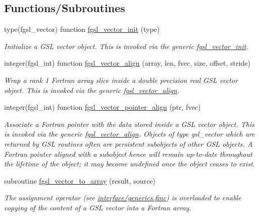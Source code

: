 \subsection*{Functions/\-Subroutines}
\begin{DoxyCompactItemize}
\item 
type(fgsl\-\_\-vector) function \hyperlink{array_8finc_a0b6fe341146fbb3dfb27386e73c5d042}{fgsl\-\_\-vector\-\_\-init} (type)
\begin{DoxyCompactList}\small\item\em Initialize a G\-S\-L vector object. This is invoked via the generic \hyperlink{interfacefgsl__vector__init}{fgsl\-\_\-vector\-\_\-init}. \end{DoxyCompactList}\item 
integer(fgsl\-\_\-int) function \hyperlink{array_8finc_aa6c28c6cc37d807bc8bc0fcf4ab7ad57}{fgsl\-\_\-vector\-\_\-align} (array, len, fvec, size, offset, stride)
\begin{DoxyCompactList}\small\item\em Wrap a rank 1 Fortran array slice inside a double precision real G\-S\-L vector object. This is invoked via the generic \hyperlink{interfacefgsl__vector__align}{fgsl\-\_\-vector\-\_\-align}. \end{DoxyCompactList}\item 
integer(fgsl\-\_\-int) function \hyperlink{array_8finc_a3f528d8f3b1aa8218339bc8fdb41497c}{fgsl\-\_\-vector\-\_\-pointer\-\_\-align} (ptr, fvec)
\begin{DoxyCompactList}\small\item\em Associate a Fortran pointer with the data stored inside a G\-S\-L vector object. This is invoked via the generic \hyperlink{interfacefgsl__vector__align}{fgsl\-\_\-vector\-\_\-align}. Objects of type {\ttfamily gsl\-\_\-vector} which are returned by G\-S\-L routines often are persistent subobjects of other G\-S\-L objects. A Fortran pointer aligned with a subobject hence will remain up-\/to-\/date throughout the lifetime of the object; it may become undefined once the object ceases to exist. \end{DoxyCompactList}\item 
subroutine \hyperlink{array_8finc_a740b61c719ee64b92abc804915115255}{fgsl\-\_\-vector\-\_\-to\-\_\-array} (result, source)
\begin{DoxyCompactList}\small\item\em The assignment operator (see \hyperlink{generics_8finc}{interface/generics.\-finc}) is overloaded to enable copying of the content of a G\-S\-L vector into a Fortran array. \end{DoxyCompactList}\item 

\end{DoxyCompactItemize}
